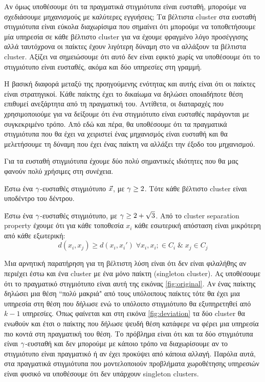 Αν όμως υποθέσουμε ότι τα πραγματικά στιγμιότυπα είναι ευσταθή, μπορούμε να σχεδιάσουμε μηχανισμούς με καλύτερες εγγυήσεις; Τα βέλτιστα cluster στα ευσταθή στιγμιότυπα είναι εύκολα διαχωρίσιμα που σημαίνει ότι μπορούμε να τοποθετήσουμε μία υπηρεσία σε κάθε βέλτιστο cluster για να έχουμε φραγμένο λόγο προσέγγισης αλλά ταυτόχρονα οι παίκτες έχουν λιγότερη δύναμη στο να αλλάξουν τα βέλτιστα cluster. Αξίζει να σημειώσουμε ότι αυτό δεν είναι εφικτό χωρίς να υποθέσουμε ότι το στιγμιότυπο είναι ευσταθές, ακόμα και δύο υπηρεσίες στη γραμμή.

Η βασική διαφορά μεταξύ της προηγούμενης ενότητας και αυτής είναι ότι οι παίκτες είναι στρατηγικοί. Κάθε παίκτης έχει το δικαίωμα να δηλώσει οποιαδήποτε θέση επιθυμεί ανεξάρτητα από τη πραγματική του. Αντίθετα, οι διαταραχές που χρησιμοποιούμε για να δείξουμε ότι ένα στιγμιότυπο είναι ευσταθές παράγονται με συγκεκριμένο τρόπο. Από εδώ και πέρα, θα υποθέσουμε ότι τα πραγματικά στιγμιότυπα που θα έχει να χειριστεί ένας μηχανισμός είναι ευσταθή και θα μελετήσουμε τη δύναμη που έχει ένας παίκτη να αλλάξει την έξοδο του μηχανισμού. 


Για τα ευσταθή στιγμιότυπα έχουμε δύο πολύ σημαντικές ιδιότητες που θα μας φανούν πολύ χρήσιμες στη συνέχεια.

\begin{lemmagr}\label{con}
Έστω ένα $\gamma$-ευσταθές στιγμιότυπο $\vec{x}$, με $\gamma\ge2$. Τότε κάθε βέλτιστο cluster είναι υποδέντρο του δέντρου.
\end{lemmagr}

\begin{lemmagr}
Έστω ένα $\gamma$-ευσταθές στιγμιότυπο, με $\gamma\ge2+\sqrt{3}$. Από το cluster separation property έχουμε ότι για κάθε τοποθεσία $x_i$ κάθε εσωτερική απόσταση είναι μικρότερη από κάθε εξωτερική:
\[ d(x_i,x_j) \ge d(x_i,x_i') \; \forall x_i,x_i;\in C_i \;\&\; x_j \in C_j\]
\end{lemmagr}

Μια αρνητική παρατήρηση για τη βέλτιστη λύση είναι ότι δεν είναι φιλαλήθης αν περιέχει έστω και ένα cluster με ένα μόνο παίκτη (singleton cluster). Ας υποθέσουμε ότι το πραγματικό στιγμιότυπο είναι αυτή της εικόνας \ref{fig:original}. Αν ένας παίκτης δηλώσει μια θέση ``πολύ μακριά" από τους υπόλοιπους παίκτες τότε θα έχει μια υπηρεσία στη θέση που δήλωσε ενώ το υπόλοιπο στιγμιότυπο θα εξυπηρετηθεί από $k-1$ υπηρεσίες. Όπως φαίνεται και στη εικόνα \ref{fig:deviation} τα δύο cluster θα ενωθούν και έτσι ο παίκτης που δήλωσε ψευδή θέση κατάφερε να φέρει μια υπηρεσία πιο κοντά στη πραγματική του θέση. Το πρόβλημα είναι ότι και τα δύο στιγμιότυπα είναι $\gamma$-ευσταθή και δεν μπορούμε με κάποιο τρόπο να διαχωρίσουμε αν το στιγμιότυπο είναι πραγματικό ή αν έχει προκύψει από κάποια αλλαγή. Παρόλα αυτά, στα πραγματικά στιγμιότυπα που μοντελοποιούν προβλήματα χωροθέτησης υπηρεσιών είναι φυσικό να υποθέσουμε ότι δεν υπάρχουν singleton clusters. 



